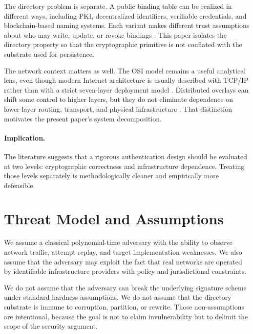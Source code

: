 \documentclass[11pt,a4paper]{article}
\begin{document}
The directory problem is separate. A public binding table can be realized in different ways, including PKI, decentralized identifiers, verifiable credentials, and blockchain-based naming systems. Each variant makes different trust assumptions about who may write, update, or revoke bindings \cite{rfc5280,did2022,vc2019,webauthn2021,eip4361,handshake}. This paper isolates the directory property so that the cryptographic primitive is not conflated with the substrate used for persistence.

The network context matters as well. The OSI model remains a useful analytical lens, even though modern Internet architecture is usually described with TCP/IP rather than with a strict seven-layer deployment model \cite{iso1994,cerf1974}. Distributed overlays can shift some control to higher layers, but they do not eliminate dependence on lower-layer routing, transport, and physical infrastructure \cite{maymounkov2002,ipfs}. That distinction motivates the present paper's system decomposition.

\paragraph{Implication.} The literature suggests that a rigorous authentication design should be evaluated at two levels: cryptographic correctness and infrastructure dependence. Treating those levels separately is methodologically cleaner and empirically more defensible.

\section{Threat Model and Assumptions}

We assume a classical polynomial-time adversary with the ability to observe network traffic, attempt replay, and target implementation weaknesses. We also assume that the adversary may exploit the fact that real networks are operated by identifiable infrastructure providers with policy and jurisdictional constraints.

We do not assume that the adversary can break the underlying signature scheme under standard hardness assumptions. We do not assume that the directory substrate is immune to corruption, partition, or rewrite. Those non-assumptions are intentional, because the goal is not to claim invulnerability but to delimit the scope of the security argument.
\end{document}
